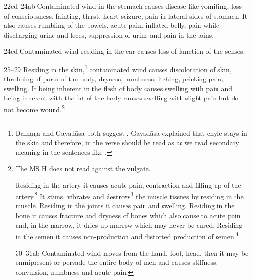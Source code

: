 \begin{translation}
\item[22cd--24ab] Contaminated wind in the stomach causes disease like vomiting, 
loss of consciousness, fainting, thirst, heart-seizure, pain in lateral sides of stomach. 
It also causes rumbling of the bowels, acute pain, inflated belly, pain while discharging 
urine and feces, suppression of urine and pain in the loins. 

\item[24cd]Contaminated wind residing in the ear causes loss of function of the senses.

\item[25--29] Residing in the skin,\footnote{Ḍalhaṇa and Gayadāsa both suggest . Gayadāsa explained that chyle stays in the skin and therefore, in the verse  should be read as  as we read secondary meaning in the sentences like .} contaminated wind causes discoloration of skin, throbbing of parts of the body, dryness, numbness, itching, pricking pain, swelling. It being inherent in the flesh of body causes swelling with pain and being inherent with the fat of the body causes swelling with slight pain but do not become wound.\footnote{The MS H does not read  against the vulgate. \citep[261]{vulgate}

Residing in the artery it causes acute pain, contraction and filling up of the artery.\footnote{According to Ḍalhaṇa  is also known as  \citep[262]{vulgate}} It stuns, vibrates and destroys\footnote{Ḍalhaṇa and Gayadāsa both suggest the meaning of  for being not capable of both stretching and contraction.  \citep[262]{vulgate}  } the muscle tissues by residing in the muscle. Residing in the joints it causes pain and swelling. Residing in the bone it causes fracture and dryness of bones which also cause to acute pain and, in the marrow, it dries up marrow which may never be cured. Residing in the semen it causes non-production and distorted production of semen.\footnote{Ḍalhaṇa and Gayadāsa both suggest that a distorted production  is too fast, too slow, knotty and discolored} 


\item[30--31ab] Contaminated wind moves from the hand, foot, head, then it may be omnipresent or pervade the entire body of men and causes stiffness, convulsion, numbness and acute pain.

}
\end{translation}
